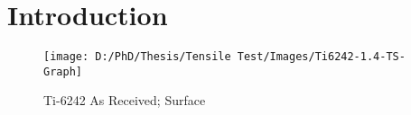 \chapter{Introduction}

\begin{figure}[H]
    \centering
        \texttt{[image: D:/PhD/Thesis/Tensile Test/Images/Ti6242-1.4-TS-Graph]}
        \caption{Ti-6242 As Received; Surface}
    \label{fig:EDM-Cut}
\end{figure}